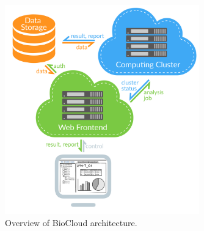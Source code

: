 \begin{figure}[!htbp]
\centering
\includegraphics[width=0.75\textwidth]{images/overview_arch}
\caption[BioCloud overview architecture]{Overview of BioCloud architecture.}
\label{fig:overview-arch}
\end{figure}


